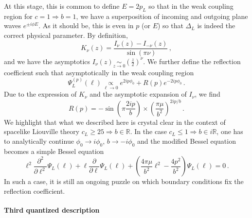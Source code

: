 \documentclass[a4paper]{article}
\begin{document}
At this stage, this is common to define $E = 2p_L$ so that in the weak coupling region for $c=1 \Rightarrow b=1$, we have a superposition of incoming and outgoing plane waves $e^{\pm i\phi E}$. As it should be, this is even in $p$ (or $E$) so that $\Delta_L$ is indeed the correct physical parameter. By definition,
\begin{equation}
  K_{\nu}(z)=\frac{I_{\nu}(z)-I_{-\nu}(z)}{\sin(\pi \nu)}\,,
\end{equation}
and we have the asymptotics $I_{\nu}(z)\underset{z\to 0}{\sim} \left(\frac{z}{2}\right)^\nu$. We further define the reflection coefficient such that asymptotically in the weak coupling region
\begin{equation}
  \Psi^{(p)}_L(\ell) \underset{\ell \to 0}{\propto} e^{2ip\phi_0}+ R(p)e^{-2ip\phi_0}\,.
\end{equation}
Due to the expression of $K_\nu$ and the asymptotic expansion of $I_\nu$, we find
\begin{equation}
  R(p)=-\sin\left(\pi\frac{2ip}{b}\right)\times \left(\frac{\pi \mu}{b^2}\right)^{2ip/b}\,.
\end{equation}
We highlight that what we described here is crystal clear in the context of spacelike Liouville theory $c_L\geq 25 \Rightarrow b\in \mathbb{R}$. In the case $c_L\leq 1\Rightarrow b \in i\mathbb{R}$, one has to analytically continue $\phi_0 \to i\phi_0,\,b\to -i\phi_0$ and the modified Bessel equation becomes a simple Bessel equation
\begin{equation}\label{eq:Wheeler-De-Witt-spacelike}
  \ell^2\frac{\partial^2}{\partial{\ell}^2}\Psi_L(\ell)+\ell\frac{\partial}{\partial{\ell}}\Psi_L(\ell)+\left(\frac{4\pi\mu}{b^2}\ell^2-\frac{4p^2}{b^2}\right)\Psi_L(\ell)=0\,.
\end{equation}
In such a case, it is still an ongoing puzzle on which boundary conditions fix the reflection coefficient.

\paragraph{Third quantized description}
\end{document}
